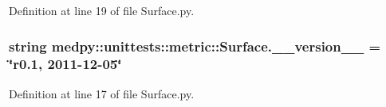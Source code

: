 Definition at line 19 of file Surface.py.

\hypertarget{namespacemedpy_1_1unittests_1_1metric_1_1Surface_adf05ce1f02cfc20513e1f47d683a7b88}{
\subsubsection[{\_\-\_\-version\_\-\_\-}]{\setlength{\rightskip}{0pt plus 5cm}string {\bf medpy::unittests::metric::Surface.\_\-\_\-version\_\-\_\-} = \char`\"{}r0.1, 2011-\/12-\/05\char`\"{}}}
\label{namespacemedpy_1_1unittests_1_1metric_1_1Surface_adf05ce1f02cfc20513e1f47d683a7b88}


Definition at line 17 of file Surface.py.

